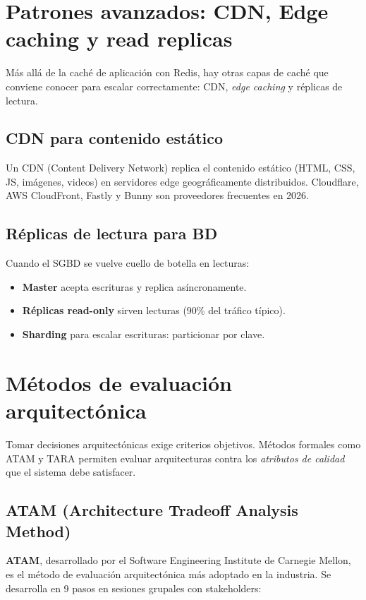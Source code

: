 \section{Patrones avanzados: CDN, Edge caching y read replicas}

Más allá de la caché de aplicación con Redis, hay otras
capas de caché que conviene conocer para escalar correctamente:
CDN, \emph{edge caching} y réplicas de lectura.


\subsection{CDN para contenido estático}

Un CDN (Content Delivery Network) replica el contenido estático
(HTML, CSS, JS, imágenes, videos) en servidores edge geográficamente
distribuidos. Cloudflare, AWS CloudFront, Fastly y Bunny son
proveedores frecuentes en 2026.

\subsection{Réplicas de lectura para BD}

Cuando el SGBD se vuelve cuello de botella en lecturas:

\begin{itemize}
\item \textbf{Master} acepta escrituras y replica asíncronamente.
\item \textbf{Réplicas read-only} sirven lecturas (90\% del tráfico
típico).
\item \textbf{Sharding} para escalar escrituras: particionar por clave.
\end{itemize}

\section{Métodos de evaluación arquitectónica}

Tomar decisiones arquitectónicas exige criterios objetivos.
Métodos formales como ATAM y TARA permiten evaluar arquitecturas
contra los \emph{atributos de calidad} que el sistema debe satisfacer.


\subsection{ATAM (Architecture Tradeoff Analysis Method)}

\textbf{ATAM}, desarrollado por el Software Engineering Institute de
Carnegie Mellon, es el método de evaluación arquitectónica más
adoptado en la industria. Se desarrolla en 9 pasos en sesiones
grupales con stakeholders:


